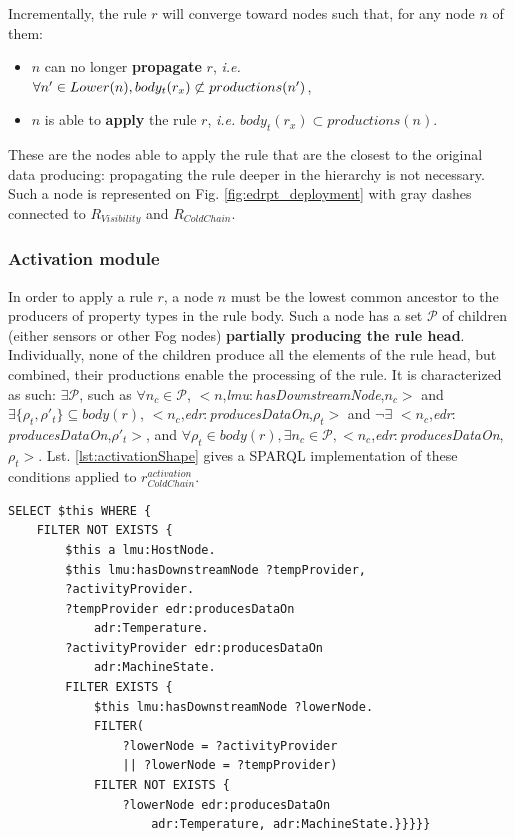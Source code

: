 \documentclass[sw]{iosart2x}
\newcommand{\namespace}[1]{\textit{#1$:$}}
\newcommand{\concept}[2]{\namespace{#1}\-\textit{#2}}
\newcommand{\triplet}[3]{$<$#1,\textit{#2},#3$>$}
\begin{document}
Incrementally, the rule $r$ will converge toward nodes such that, for any node $n$ of them:
\begin{itemize}
	\item $n$ can no longer \textbf{propagate} $r$, \textit{i.e.} $\forall n'\in Lo\-wer(n), body_t(r_{x})\not\subset pro\-du\-ctions(n')$,
	\item $n$ is able to \textbf{apply} the rule $r$, \textit{i.e.} $body_t(r_{x})\subset productions(n)$.
\end{itemize} 
These are the nodes able to apply the rule that are the closest to the original data producing: propagating the rule deeper in the hierarchy is not necessary.
Such a node is represented on Fig. \ref{fig:edrpt_deployment} with gray dashes connected to $R_{Visibility}$ and $R_{ColdChain}$. 

\subsubsection{Activation module}

In order to apply a rule $r$, a node $n$ must be the lowest common ancestor to the producers of property types in the rule body. 
Such a node has a set $\mathcal{P}$ of children (either sensors or other Fog nodes) \textbf{partially producing the rule head}. 
Individually, none of the children produce all the elements of the rule head, but combined, their productions enable the processing of the rule. 
It is characterized as such: $\exists \mathcal{P}$, such as $\forall n_c\in \mathcal{P}$, \triplet{$n$}{\concept{lmu}{has\-Down\-stream\-Node}}{$n_c$} and $\exists \{\rho_t, \rho'_t\} \subseteq body(r)$, \triplet{$n_c$}{\concept{edr}{produces\-Data\-On}}{$\rho_t$} and $\neg\exists$ \triplet{$n_c$}{\concept{edr}{produces\-Data\-On}}{$\rho'_t$}, and $\forall \rho_t \in body(r), \exists n_c\in \mathcal{P},$\triplet{$n_c$}{\concept{edr}{produces\-Data\-On}}{$\rho_t$}.
Lst. \ref{lst:activationShape} gives a SPARQL implementation of these conditions applied to $r_{ColdChain}^{activation}$. 

\begin{lstlisting}[float, caption=$r_{ColdChain}^{activation}$ shape, label=lst:activationShape]
SELECT $this WHERE {
	FILTER NOT EXISTS {
		$this a lmu:HostNode.
		$this lmu:hasDownstreamNode ?tempProvider,
		?activityProvider.
		?tempProvider edr:producesDataOn 
			adr:Temperature.
		?activityProvider edr:producesDataOn 
			adr:MachineState.
		FILTER EXISTS {
			$this lmu:hasDownstreamNode ?lowerNode.
			FILTER(
				?lowerNode = ?activityProvider 
				|| ?lowerNode = ?tempProvider)
			FILTER NOT EXISTS {
				?lowerNode edr:producesDataOn 
					adr:Temperature, adr:MachineState.}}}}}
\end{lstlisting}
\end{document}
